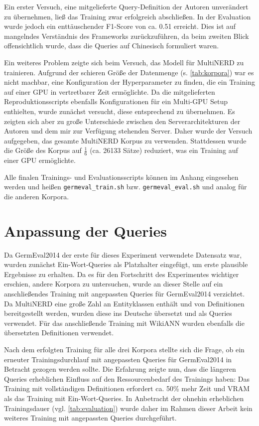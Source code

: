 Ein erster Versuch, eine mitgelieferte Query-Definition der Autoren unverändert zu übernehmen, ließ das Training zwar erfolgreich abschließen. In der Evaluation wurde jedoch ein enttäuschender F1-Score von ca. 0.51 erreicht. Dies ist auf mangelndes Verständnis des Frameworks zurückzuführen, da beim zweiten Blick offensichtlich wurde, dass die Queries auf Chinesisch formuliert waren.

Ein weiteres Problem zeigte sich beim Versuch, das Modell für MultiNERD zu trainieren. Aufgrund der schieren Größe der Datenmenge (s. \autoref{tab:korpora}) war es nicht machbar, eine Konfiguration der Hyperparameter zu finden, die ein Training auf einer GPU in vertretbarer Zeit ermöglichte. Da die mitgelieferten Reproduktionsscripts ebenfalls Konfigurationen für ein Multi-GPU Setup enthielten, wurde zunächst versucht, diese entsprechend zu übernehmen. Es zeigten sich aber zu große Unterschiede zwischen den Serverarchitekturen der Autoren und dem mir zur Verfügung stehenden Server. Daher wurde der Versuch aufgegeben, das gesamte MultiNERD Korpus zu verwenden. Stattdessen wurde die Größe des Korpus auf \(\frac{1}{6}\) (ca. 26133 Sätze) reduziert, was ein Training auf einer GPU ermöglichte.

Alle finalen Trainings- und Evaluationsscripts können im Anhang eingesehen werden und heißen \verb|germeval_train.sh| bzw. \verb|germeval_eval.sh| und analog für die anderen Korpora.


\section{Anpassung der Queries}
\label{ch:Training:sec:Anpassung_Queries}


Da GermEval2014 der erste für dieses Experiment verwendete Datensatz war, wurden zunächst Ein-Wort-Queries als Platzhalter eingefügt, um erste plausible Ergebnisse zu erhalten. Da es für den Fortschritt des Experimentes wichtiger erschien, andere Korpora zu untersuchen, wurde an dieser Stelle auf ein anschließendes Training mit angepassten Queries für GermEval2014 verzichtet. Da MultiNERD eine große Zahl an Entityklassen enthält und von \cite{multinerd} Definitionen bereitgestellt werden, wurden diese ins Deutsche übersetzt und als Queries verwendet. Für das anschließende Training mit WikiANN wurden ebenfalls die übersetzten Definitionen verwendet.

Nach dem erfolgten Training für alle drei Korpora stellte sich die Frage, ob ein erneuter Trainingsdurchlauf mit angepassten Queries für GermEval2014 in Betracht gezogen werden sollte. Die Erfahrung zeigte nun, dass die längeren Queries erheblichen Einfluss auf den Ressourcenbedarf des Trainings haben: Das Training mit vollständigen Definitionen erfordert ca. 50\% mehr Zeit und VRAM als das Training mit Ein-Wort-Queries. In Anbetracht der ohnehin erheblichen Trainingsdauer (vgl. \autoref{tab:evaluation}) wurde daher im Rahmen dieser Arbeit kein weiteres Training mit angepassten Queries durchgeführt.

